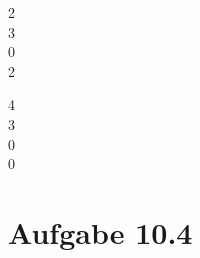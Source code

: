 \documentclass[12pt, paper=a4]{article}
\begin{document}
	\begin{pmatrix} 2\\ 3 \\ 0 \\ 2 \end{pmatrix} 
	\begin{pmatrix} 4\\ 3 \\ 0 \\ 0 \end{pmatrix} \)


\section*{Aufgabe 10.4}
\end{document}
